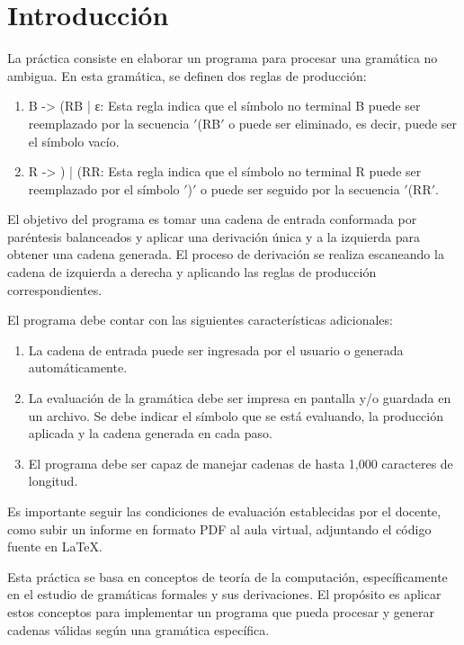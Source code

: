 \chapter{Introducción}
La práctica consiste en elaborar un programa para procesar una gramática no ambigua. En esta gramática, se definen dos reglas de producción:\newline
\begin{enumerate}
    \item B -> (RB | ε: Esta regla indica que el símbolo no terminal B puede ser reemplazado por la secuencia $'$(RB$'$ o puede ser eliminado, es decir, puede ser el símbolo vacío.\newline
    \item R -> ) | (RR: Esta regla indica que el símbolo no terminal R puede ser reemplazado por el símbolo $'$)$'$ o puede ser seguido por la secuencia $'$(RR$'$.\newline
\end{enumerate}

El objetivo del programa es tomar una cadena de entrada conformada por paréntesis balanceados y aplicar una derivación única y a la izquierda para obtener una cadena generada. El proceso de derivación se realiza escaneando la cadena de izquierda a derecha y aplicando las reglas de producción correspondientes.\newline

El programa debe contar con las siguientes características adicionales:\newline
\begin{enumerate}
    \item La cadena de entrada puede ser ingresada por el usuario o generada automáticamente.\newline
    \item La evaluación de la gramática debe ser impresa en pantalla y/o guardada en un archivo. Se debe indicar el símbolo que se está evaluando, la producción aplicada y la cadena generada en cada paso.\newline
    \item El programa debe ser capaz de manejar cadenas de hasta 1,000 caracteres de longitud.\newline
\end{enumerate}

Es importante seguir las condiciones de evaluación establecidas por el docente, como subir un informe en formato PDF al aula virtual, adjuntando el código fuente en LaTeX.\newline

Esta práctica se basa en conceptos de teoría de la computación, específicamente en el estudio de gramáticas formales y sus derivaciones. El propósito es aplicar estos conceptos para implementar un programa que pueda procesar y generar cadenas válidas según una gramática específica.\newline
